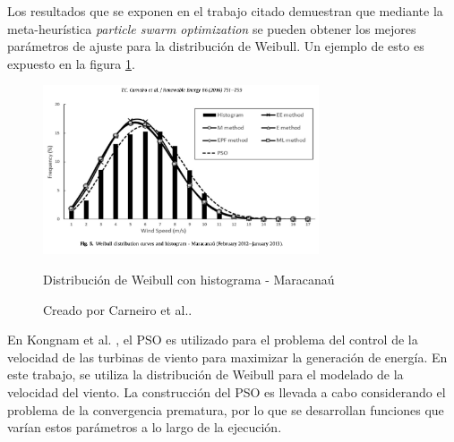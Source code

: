 Los resultados que se exponen en el trabajo citado demuestran que mediante la meta-heurística \emph{particle swarm optimization} se pueden obtener los mejores parámetros de ajuste para la distribución de Weibull. Un ejemplo de esto es expuesto en la figura \ref{fig:pso_fit}.
\begin{figure}[h!]
    \centering    
    \includegraphics[height=50mm]{figures/pso_fit.png} 
    \caption{Distribución de Weibull con histograma - Maracanaú}
    \vspace{-.25cm} 
    \caption*{Creado por Carneiro et al.\cite{Carneiro15}.}
    \label{fig:pso_fit}
\end{figure}
En Kongnam et al. \cite{Kongnam15}, el PSO es utilizado para el problema del control de la velocidad de las turbinas de viento para maximizar la generación de energía. En este trabajo, se utiliza la distribución de Weibull para el modelado de la velocidad del viento. La construcción del PSO es llevada a cabo considerando el problema de la convergencia prematura, por lo que se desarrollan funciones que varían estos parámetros a lo largo de la ejecución.\\

